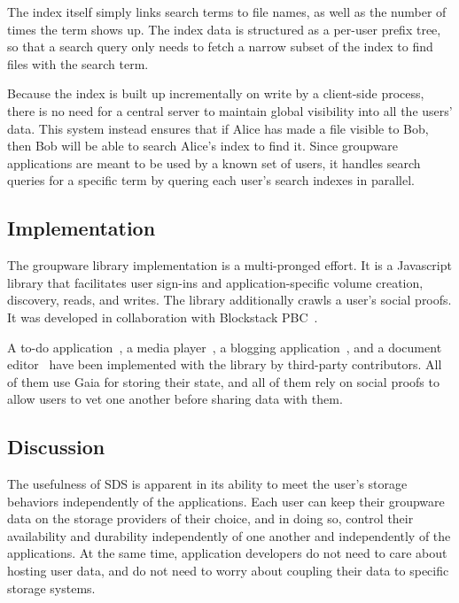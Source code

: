 The index itself simply links search terms to file names, as well as the number
of times the term shows up.  The index data is structured as a per-user prefix tree, so
that a search query only needs to fetch a narrow subset of the index to find
files with the search term.

Because the index is built up incrementally on
write by a client-side process, there is no need for a central server to
maintain global visibility into all the users' data.  This system instead
ensures that if Alice has made a file visible to Bob, then Bob will be able to
search Alice's index to find it.  Since groupware applications are meant to be
used by a known set of users, it handles search queries for a specific term by
quering each user's search indexes in parallel.

\subsection{Implementation}

The groupware library implementation is a multi-pronged effort.
It is a Javascript library that facilitates user
sign-ins and application-specific volume creation, discovery, reads, and writes.
The library additionally crawls a user's social proofs.  It was developed in
collaboration with Blockstack PBC~\cite{blockstack-pbc}.

A to-do application~\cite{blockstack-todos}, a media
player~\cite{blockstack-media-app}, a blogging
application~\cite{blockstack-blogging-app}, and a document
editor~\cite{blockstack-graphite} have been
implemented with the library by third-party contributors.
All of them use Gaia for storing their state, and all of them rely on social
proofs to allow users to vet one another before sharing data with them.

\subsection{Discussion}

The usefulness of SDS is apparent in its ability to meet the user's storage behaviors
independently of the applications.  Each user can keep their groupware data on
the storage providers of their choice, and in doing so, control their
availability and durability independently of one another and independently of
the applications.  At the same time, application developers do not need to care
about hosting user data, and do not need to worry about coupling their data to
specific storage systems.

